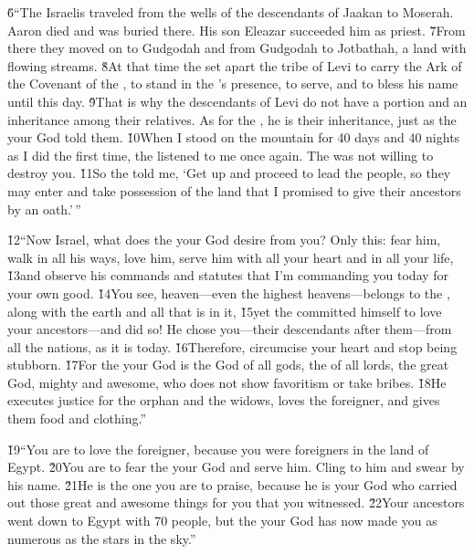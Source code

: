 \v{6}``The Israelis traveled from the wells of the descendants of Jaakan to Moserah. Aaron died and was buried there. His son Eleazar succeeded him as priest. \v{7}From there they moved on to Gudgodah and from Gudgodah to Jotbathah, a land with flowing streams. \v{8}At that time the  set apart the tribe of Levi to carry the Ark of the Covenant of the , to stand in the 's presence, to serve, and to bless his name until this day. \v{9}That is why the descendants of Levi do not have a portion and an inheritance among their relatives. As for the , he is their inheritance, just as the  your God told them. \v{10}When I stood on the mountain for 40 days and 40 nights as I did the first time, the  listened to me once again. The  was not willing to destroy you. \v{11}So the  told me, `Get up and proceed to lead the people, so they may enter and take possession of the land that I promised to give their ancestors by an oath.'\,''

\v{12}``Now Israel, what does the  your God desire from you? Only this: fear him, walk in all his ways, love him, serve him with all your heart and in all your life, \v{13}and observe his commands and statutes that I'm commanding you today for your own good. \v{14}You see, heaven---even the highest heavens---belongs to the , along with the earth and all that is in it, \v{15}yet the  committed himself to love your ancestors---and did so! He chose you---their descendants after them---from all the nations, as it is today. \v{16}Therefore, circumcise your heart and stop being stubborn. \v{17}For the  your God is the God of all gods, the  of all lords, the great God, mighty and awesome, who does not show favoritism or take bribes. \v{18}He executes justice for the orphan and the widows, loves the foreigner, and gives them food and clothing.''

\v{19}``You are to love the foreigner, because you were foreigners in the land of Egypt. \v{20}You are to fear the  your God and serve him. Cling to him and swear by his name. \v{21}He is the one you are to praise, because he is your God who carried out those great and awesome things for you that you witnessed. \v{22}Your ancestors went down to Egypt with 70 people, but the  your God has now made you as numerous as the stars in the sky.''


